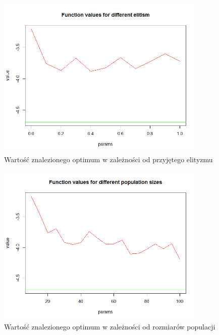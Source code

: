 \documentclass[11pt, a4paper]{article}
\begin{document}
\begin{figure}[H]
	\begin{center}
		\includegraphics[width=0.9\textwidth]{./assets/EMichalewicz4.png} %
		\caption{Wartość znalezionego optimum w zależności od przyjętego elityzmu}
		\label{fig:gulf7}
	\end{center}
\end{figure}
\begin{figure}[H]
	\begin{center}
		\includegraphics[width=0.9\textwidth]{./assets/EMichalewicz5.png} %
		\caption{Wartość znalezionego optimum w zależności od rozmiarów populacji}
		\label{fig:gulf7}
	\end{center}
\end{figure}
\end{document}
